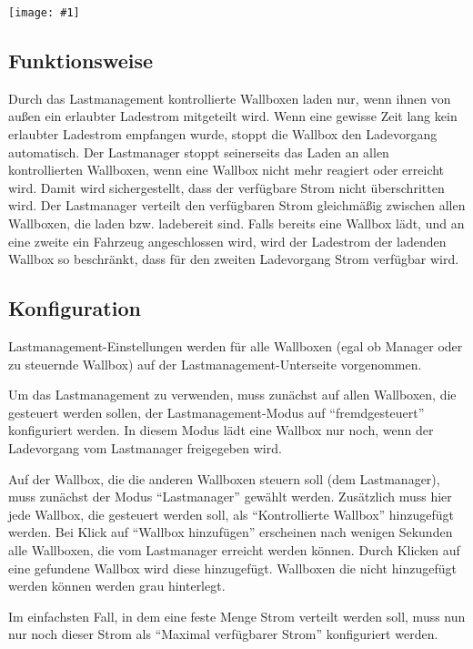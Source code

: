\documentclass[a4paper,10pt]{article}
\newcommand{\gfx}[1]{\texttt{[image: \#1]}}
\begin{document}
\begin{multicols*}{2}
    \gfx{./img_warp2/resized/web_charge_manager}

    \subsection{Funktionsweise}
    Durch das Lastmanagement kontrollierte Wallboxen laden nur,
    wenn ihnen von außen ein erlaubter Ladestrom mitgeteilt wird. Wenn eine gewisse Zeit lang
    kein erlaubter Ladestrom empfangen wurde, stoppt die Wallbox den Ladevorgang automatisch.
    Der Lastmanager stoppt seinerseits das Laden an allen kontrollierten Wallboxen,
    wenn eine Wallbox nicht mehr reagiert oder erreicht wird. Damit wird sichergestellt,
    dass der verfügbare Strom nicht überschritten wird.
    Der Lastmanager verteilt den verfügbaren Strom gleichmäßig zwischen allen Wallboxen, die laden bzw. ladebereit sind.
    Falls bereits eine Wallbox lädt, und an eine zweite ein Fahrzeug angeschlossen wird,
    wird der Ladestrom der ladenden Wallbox so beschränkt, dass für den zweiten Ladevorgang Strom verfügbar wird.

    \subsection{Konfiguration}
    \vspace{-0.1cm}
    Lastmanagement-Einstellungen werden für alle Wallboxen (egal ob Manager oder zu steuernde Wallbox) auf der
    Lastmanagement-Unterseite vorgenommen.

    Um das Lastmanagement zu verwenden, muss zunächst auf allen Wallboxen, die gesteuert werden sollen,
    der Lastmanagement-Modus auf \enquote{fremdgesteuert} konfiguriert werden.
    In diesem Modus lädt eine Wallbox nur noch, wenn der Ladevorgang vom Lastmanager freigegeben wird.

    Auf der Wallbox, die die anderen Wallboxen steuern soll (dem Lastmanager), muss zunächst der Modus \enquote{Lastmanager} gewählt werden.
    Zusätzlich muss hier jede Wallbox, die gesteuert werden soll, als \enquote{Kontrollierte Wallbox} hinzugefügt werden.
    Bei Klick auf \enquote{Wallbox hinzufügen} erscheinen nach wenigen Sekunden alle Wallboxen, die vom Lastmanager erreicht werden können.
    Durch Klicken auf eine gefundene Wallbox wird diese hinzugefügt. Wallboxen die nicht hinzugefügt werden können werden grau hinterlegt.

    Im einfachsten Fall, in dem eine feste Menge Strom verteilt werden soll, muss nun nur noch dieser
    Strom als \enquote{Maximal verfügbarer Strom} konfiguriert werden.


\end{multicols*}
\end{document}
